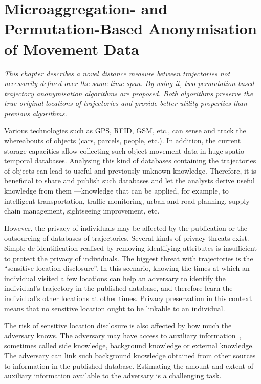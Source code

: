 \chapter{Microaggregation- and Permutation-Based Anonymisation of Movement Data}
\label{chap:7}

\emph{This chapter describes a novel distance measure between trajectories not
necessarily defined over the same time span.
By using it, two permutation-based trajectory anonymisation algorithms are proposed. Both algorithms preserve the true original locations of trajectories and provide better utility properties than previous algorithms.}

\minitoc


Various technologies such as GPS, RFID, GSM, etc., can sense and track
the whereabouts of objects (cars, parcels, people, etc.).
In addition, the current storage capacities allow
collecting such object movement data in huge spatio-temporal
databases. Analysing this kind of databases containing
the trajectories of objects
can lead to useful and previously unknown knowledge. Therefore, it is
beneficial to share and publish such databases and let the analysts derive
useful knowledge from them ---knowledge that can be applied, for example, to
intelligent transportation, traffic monitoring, urban and road planning,
supply chain management, sightseeing improvement, etc.

However, the privacy of individuals
may be affected by the publication or the outsourcing
of databases of trajectories. Several kinds of privacy threats
exist. Simple de-identification
realised by removing identifying attributes is insufficient to protect the
privacy of individuals. The biggest threat with trajectories is the
``sensitive location disclosure''. In this scenario, knowing the times at
which an individual visited a few locations can help an adversary to
identify the individual's trajectory in the published database, and
therefore learn the individual's other locations at other times.
Privacy preservation in this context means that no sensitive location
ought to be linkable to an individual.


The risk of sensitive location disclosure is also affected by how much the
adversary knows. The adversary may have access to auxiliary
information~\cite{kaplan10}, sometimes called side knowledge,
background knowledge or external knowledge. The adversary can link such
background knowledge obtained from other sources
to information in the published database.
Estimating the amount and extent of auxiliary information available to the
adversary is a challenging task.


